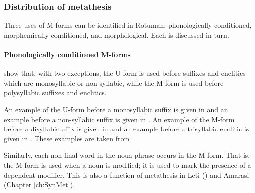 \subsubsection{Distribution of metathesis}\label{sec:RotFun}
Three uses of M-forms can be identified in Rotuman:
phonologically conditioned, morphemically conditioned, and morphological.
Each is discussed in turn.

\paragraph{Phonologically conditioned M-forms}\label{sec:RotPhoConMfo}
\citet{haki98} show that, with two exceptions,
the U-form is used before suffixes and enclitics
which are monosyllabic or non-syllabic,
while the M-form is used before polysyllabic suffixes and enclitics.

An example of the U-form before a monosyllabic suffix is given in 
and an example before a non-syllabic suffix is given in .
An example of the M-form before a disyllabic affix is given in 
and an example before a trisyllabic enclitic is given in .
These examples are taken from \cite[120f]{haki98}

\begin{exe}\let\eachwordone=\textit
	\label{RotUse1}
	\label{RotUse2}
	\label{RotUse3}
	\label{RotUse4}
\end{exe}

Similarly, each non-final word in the noun phrase occurs in the M-form.
That is, the M-form is used when a noun is modified;
it is used to mark the presence of a dependent modifier.
This is also a function of metathesis in Leti ()
and Amarasi (Chapter \ref{ch:SynMet}).

